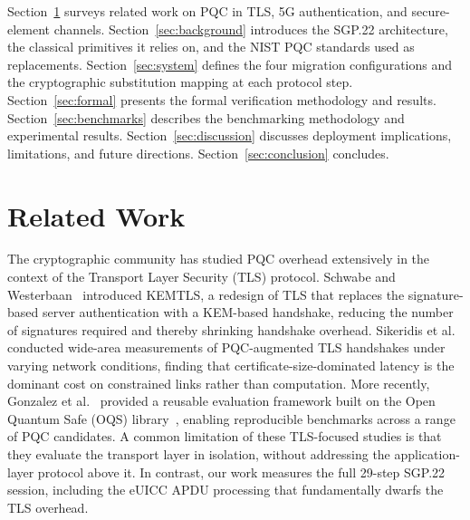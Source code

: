\documentclass[a4paper,fleqn]{cas-sc}
\begin{document}
Section~\ref{sec:related} surveys related work on PQC in TLS,
5G authentication, and secure-element channels. Section~\ref{sec:background}
introduces the SGP.22 architecture, the classical primitives it relies
on, and the NIST PQC standards used as replacements.
Section~\ref{sec:system} defines the four migration configurations and the
cryptographic substitution mapping at each protocol step.
Section~\ref{sec:formal} presents the formal verification methodology and
results. Section~\ref{sec:benchmarks} describes the benchmarking
methodology and experimental results. Section~\ref{sec:discussion}
discusses deployment implications, limitations, and future directions.
Section~\ref{sec:conclusion} concludes.

\section{Related Work}
\label{sec:related}

The cryptographic community has studied PQC overhead extensively in the
context of the Transport Layer Security (TLS) protocol. Schwabe and
Westerbaan~\cite{schwabe2020kemtls} introduced KEMTLS, a redesign of TLS
that replaces the signature-based server authentication with a KEM-based
handshake, reducing the number of signatures required and thereby
shrinking handshake overhead. Sikeridis et al.~\cite{sikeridis2020pqtls}
conducted wide-area measurements of PQC-augmented TLS handshakes under
varying network conditions, finding that certificate-size-dominated
latency is the dominant cost on constrained links rather than computation.
More recently, Gonzalez et al.~\cite{gonzalez2025pqtls} provided a
reusable evaluation framework built on the Open Quantum Safe (OQS) library~\cite{oqs2024},
enabling reproducible benchmarks across a range of PQC candidates. A
common limitation of these TLS-focused studies is that they evaluate the
transport layer in isolation, without addressing the application-layer
protocol above it. In contrast, our work measures the full 29-step SGP.22
session, including the eUICC APDU processing that fundamentally dwarfs
the TLS overhead.
\end{document}
